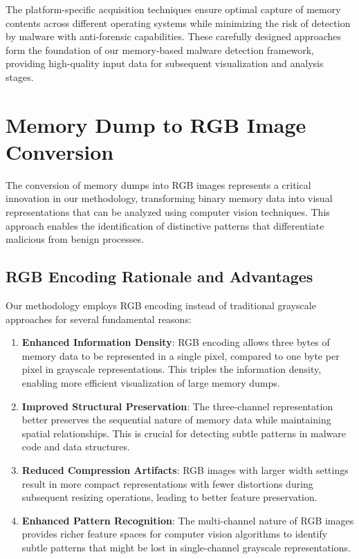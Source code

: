 The platform-specific acquisition techniques ensure optimal capture of memory contents across different operating systems while minimizing the risk of detection by malware with anti-forensic capabilities. These carefully designed approaches form the foundation of our memory-based malware detection framework, providing high-quality input data for subsequent visualization and analysis stages.

\section{Memory Dump to RGB Image Conversion}
\label{sec:rgb-conversion}

The conversion of memory dumps into RGB images represents a critical innovation in our methodology, transforming binary memory data into visual representations that can be analyzed using computer vision techniques. This approach enables the identification of distinctive patterns that differentiate malicious from benign processes.

\subsection{RGB Encoding Rationale and Advantages}
\label{subsec:rgb-rationale}

Our methodology employs RGB encoding instead of traditional grayscale approaches for several fundamental reasons:

\begin{enumerate}
    \item \textbf{Enhanced Information Density}: RGB encoding allows three bytes of memory data to be represented in a single pixel, compared to one byte per pixel in grayscale representations. This triples the information density, enabling more efficient visualization of large memory dumps.
    
    \item \textbf{Improved Structural Preservation}: The three-channel representation better preserves the sequential nature of memory data while maintaining spatial relationships. This is crucial for detecting subtle patterns in malware code and data structures.
    
    \item \textbf{Reduced Compression Artifacts}: RGB images with larger width settings result in more compact representations with fewer distortions during subsequent resizing operations, leading to better feature preservation.
    
    \item \textbf{Enhanced Pattern Recognition}: The multi-channel nature of RGB images provides richer feature spaces for computer vision algorithms to identify subtle patterns that might be lost in single-channel grayscale representations.
\end{enumerate}

